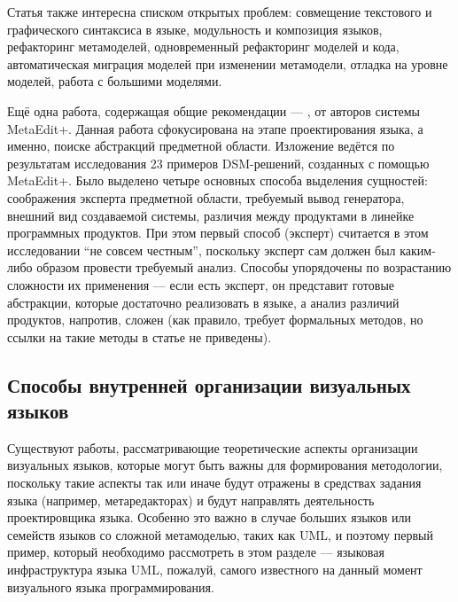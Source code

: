 Статья также интересна списком открытых проблем: совмещение текстового и графического 
синтаксиса в языке, модульность и композиция языков, рефакторинг метамоделей, одновременный 
рефакторинг моделей и кода, автоматическая миграция моделей при изменении метамодели, 
отладка на уровне моделей, работа с большими моделями.

Ещё одна работа, содержащая общие рекомендации --- \cite{luoma2004defining}, от авторов 
системы MetaEdit+. Данная работа сфокусирована на этапе проектирования языка, а именно, 
поиске абстракций предметной области. Изложение ведётся по результатам исследования 
23 примеров DSM-решений, созданных с помощью MetaEdit+. Было выделено четыре основных 
способа выделения сущностей: соображения эксперта предметной области, требуемый вывод 
генератора, внешний вид создаваемой системы, различия между продуктами в линейке программных 
продуктов. При этом первый способ (эксперт) считается в этом исследовании "`не совсем 
честным"', поскольку эксперт сам должен был каким-либо образом провести требуемый 
анализ. Способы упорядочены по возрастанию сложности их применения --- если есть эксперт, 
он представит готовые абстракции, которые достаточно реализовать в языке, а анализ 
различий продуктов, напротив, сложен (как правило, требует формальных методов, но 
ссылки на такие методы в статье не приведены).

\subsection{Способы внутренней организации визуальных языков}
Существуют работы, рассматривающие теоретические аспекты организации визуальных языков, 
которые могут быть важны для формирования методологии, поскольку такие аспекты так 
или иначе будут отражены в средствах задания языка (например, метаредакторах) и будут 
направлять деятельность проектировщика языка. Особенно это важно в случае больших 
языков или семейств языков со сложной метамоделью, таких как UML, и поэтому первый 
пример, который необходимо рассмотреть в этом разделе --- языковая инфраструктура 
языка UML, пожалуй, самого известного на данный момент визуального языка программирования.


